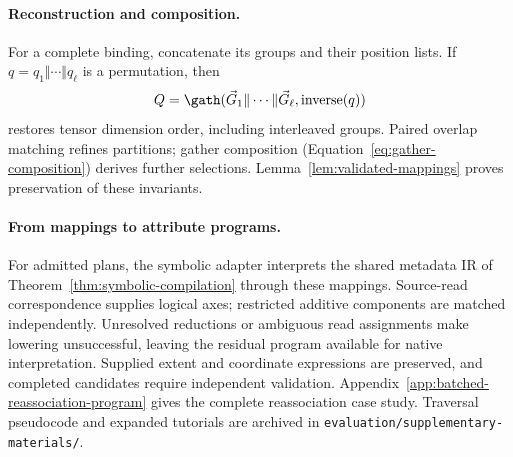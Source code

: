 \paragraph{Reconstruction and composition.}
For a complete binding, concatenate its groups and their position lists.
If $q=q_1\Vert\cdots\Vert q_\ell$ is a permutation, then
\begin{equation}
 Q=\gath(\vec G_1\Vert\cdots\Vert\vec G_\ell,\operatorname{inverse}(q))
 \label{extended:eq:rebuilt-interfaces}
\end{equation}
restores tensor dimension order, including interleaved groups.
Paired overlap matching refines partitions; gather composition
(Equation~\eqref{eq:gather-composition}) derives further selections.
Lemma~\ref{lem:validated-mappings} proves preservation of these invariants.

\paragraph{From mappings to attribute programs.}
\label{app:mappings-to-attribute-programs}
For admitted plans, the symbolic adapter interprets the shared metadata IR
of Theorem~\ref{thm:symbolic-compilation} through these mappings. Source-read
correspondence supplies logical axes; restricted additive components are
matched independently. Unresolved reductions or ambiguous read assignments
make lowering unsuccessful, leaving the residual program available for
native interpretation. Supplied extent and coordinate expressions are
preserved, and completed candidates require independent validation.
Appendix~\ref{app:batched-reassociation-program} gives the complete
reassociation case study. Traversal pseudocode and expanded tutorials are
archived in \nolinkurl{evaluation/supplementary-materials/}.
